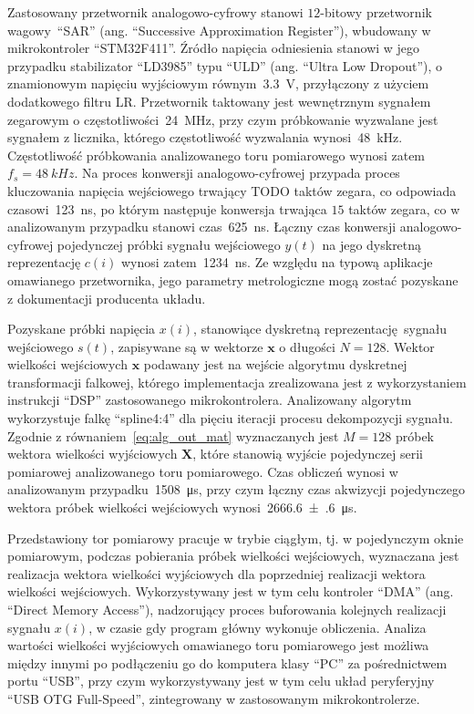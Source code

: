 Zastosowany przetwornik analogowo-cyfrowy stanowi $12$-bitowy przetwornik wagowy~\enquote{SAR} (ang. \enquote{Successive Approximation Register}), wbudowany w mikrokontroler \enquote{STM32F411}. Źródło napięcia odniesienia stanowi w jego przypadku stabilizator \enquote{LD3985} typu \enquote{ULD} (ang. \enquote{Ultra Low Dropout}), o znamionowym napięciu wyjściowym równym~\qty{3.3}{V}, przyłączony z użyciem dodatkowego filtru LR. Przetwornik taktowany jest wewnętrznym sygnałem zegarowym o częstotliwości~\qty{24}{MHz}, przy czym próbkowanie wyzwalane jest sygnałem z licznika, którego częstotliwość wyzwalania wynosi~\qty{48}{kHz}. Częstotliwość próbkowania analizowanego toru pomiarowego wynosi zatem $f_{s} = \qty{48}{kHz}$. Na proces konwersji analogowo-cyfrowej przypada proces kluczowania napięcia wejściowego trwający TODO taktów zegara, co odpowiada czasowi~\qty{123}{ns}, po którym następuje konwersja trwająca $15$ taktów zegara, co w analizowanym przypadku stanowi czas~\qty{625}{ns}. Łączny czas konwersji analogowo-cyfrowej pojedynczej próbki sygnału wejściowego $y(t)$ na jego dyskretną reprezentację $c(i)$ wynosi zatem~\qty{1234}{ns}. Ze względu na typową aplikacje omawianego przetwornika, jego parametry metrologiczne mogą zostać pozyskane z dokumentacji producenta układu.

Pozyskane próbki napięcia $x(i)$, stanowiące dyskretną reprezentację sygnału wejściowego $s(t)$, zapisywane są w wektorze $\mathbf{x}$ o długości $N = 128$. Wektor wielkości wejściowych $\mathbf{x}$ podawany jest na wejście algorytmu dyskretnej transformacji falkowej, którego implementacja zrealizowana jest z wykorzystaniem instrukcji \enquote{DSP} zastosowanego mikrokontrolera. Analizowany algorytm wykorzystuje falkę \enquote{spline4:4} dla pięciu iteracji procesu dekompozycji sygnału. Zgodnie z równaniem~\eqref{eq:alg_out_mat} wyznaczanych jest $M = 128$ próbek wektora wielkości wyjściowych $\mathbf{X}$, które stanowią wyjście pojedynczej serii pomiarowej analizowanego toru pomiarowego. Czas obliczeń wynosi w analizowanym przypadku~\qty{1508}{\micro s}, przy czym łączny czas akwizycji pojedynczego wektora próbek wielkości wejściowych wynosi~\qty{2666.6(6)}{\micro s}.

Przedstawiony tor pomiarowy pracuje w trybie ciągłym, tj. w pojedynczym oknie pomiarowym, podczas pobierania próbek wielkości wejściowych, wyznaczana jest realizacja wektora wielkości wyjściowych dla poprzedniej realizacji wektora wielkości wejściowych. Wykorzystywany jest w tym celu kontroler \enquote{DMA} (ang. \enquote{Direct Memory Access}), nadzorujący proces buforowania kolejnych realizacji sygnału $x(i)$, w czasie gdy program główny wykonuje obliczenia. Analiza wartości wielkości wyjściowych omawianego toru pomiarowego jest możliwa między innymi po podłączeniu go do komputera klasy \enquote{PC} za pośrednictwem portu \enquote{USB}, przy czym wykorzystywany jest w tym celu układ peryferyjny \enquote{USB OTG Full-Speed}, zintegrowany w zastosowanym mikrokontrolerze.

